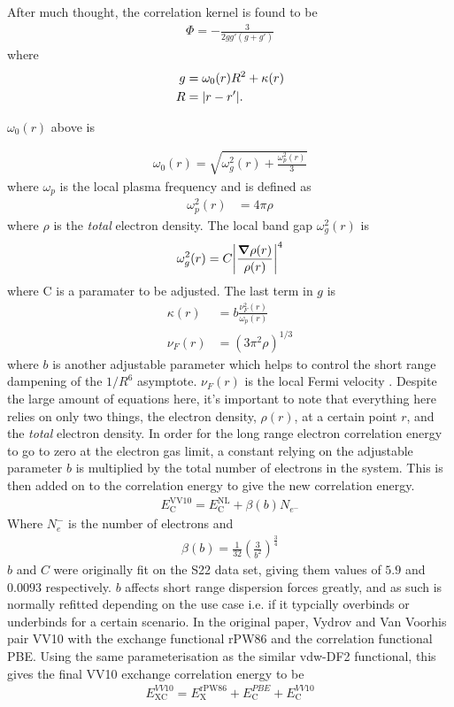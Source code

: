 \documentclass[10pt,a4paper,twocolumn,twoside]{extarticle}
\begin{document}
	After much thought, the correlation kernel is found to be  
	\begin{align}
		\Phi = - \frac{3}{2gg'(g+g')}
	\end{align}
	where 
	\begin{align}
		g &= \omega_0(r)R^2 + \kappa(r)\\
		R &= \absolutevalue{r - r'}.
	\end{align}
	
	$\omega_0(r)$ above is 

	\begin{align}
		\omega_0(r) = \sqrt{ \omega_g^2(r) + \frac{\omega_p^2(r)}{3}} 
	\end{align}
	where $\omega_p$ is the local plasma frequency and is defined as 
	\begin{align}
		\omega_p^2(r) &= 4\pi \rho
	\end{align}
	where $\rho$ is the \emph{total} electron density. The local band gap $\omega_g^2(r)$ is 
	\begin{align}
		\omega_g^2(r) = C \absolutevalue{\frac{\grad \rho(r)}{\rho(r)}}^4
	\end{align}
	where C is a paramater to be adjusted. The last term in $g$ is
	\begin{align}
		\kappa(r) &= b \frac{\nu_F^2(r)}{\omega_p(r)} \\
		\nu_F(r) &= (3 \pi^2 \rho)^{1/3}
	\end{align}
	where $b$ is another adjustable parameter which helps to control the short range dampening of the $1/R^6$ asymptote. $\nu_F(r)$ is the local Fermi velocity . 
	Despite the large amount of equations here, it's important to note that everything here relies on only two things, the electron density, $\rho(r)$, at a certain point $r$, and the \emph{total} electron density. 
	In order for the long range electron correlation energy to go to zero at the electron gas limit, a constant relying on the adjustable parameter $b$ is multiplied by the total number of electrons in the system. This is then added on to the correlation energy to give the new correlation energy.
	\begin{align}
		E_\text{C}^\text{VV10} = E_\text{C}^\text{NL} + \beta (b)N_{e^-}
	\end{align}
	Where $N_e^-$ is the number of electrons and 
	\begin{align}
		\beta(b) = \frac{1}{32} \left(\frac{3}{b^2}\right)^{\frac{3}{4}}
	\end{align}
	$b$ and $C$ were originally fit on the S22 data set, giving them values of $5.9$ and $0.0093$ respectively.\cite{Vydrov2012} $b$ affects short range dispersion forces greatly, and as such is normally refitted depending on the use case i.e. if it typcially overbinds or underbinds for a certain scenario.
	In the original paper, Vydrov and Van Voorhis pair VV10 with the exchange functional rPW86 and the correlation functional PBE. Using the same parameterisation as the similar vdw-DF2 functional, this gives the final VV10 exchange correlation energy to be 
	\begin{align}
		E_\text{XC}^{VV10} = E_\text{X}^\text{rPW86} + E_\text{C}^{PBE} + E_\text{C}^{VV10}
	\end{align} 
\end{document}
